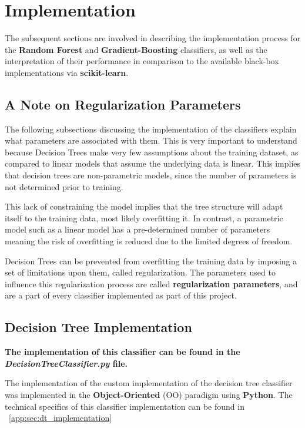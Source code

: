 \graphicspath{{images/}}

\section{Implementation}

The subsequent sections are involved in describing the implementation process for the \textbf{Random Forest} and \textbf{Gradient-Boosting} classifiers,
as well as the interpretation of their performance in comparison to the available black-box implementations via \textbf{scikit-learn}.

\subsection{A Note on Regularization Parameters}

The following subsections discussing the implementation of the classifiers explain what parameters are associated with them.
This is very important to understand because Decision Trees make very few assumptions about the training dataset, as compared to linear models that assume the underlying data is linear.
This implies that decision trees are non-parametric models, since the number of parameters is not determined prior to training.

This lack of constraining the model implies that the tree structure will adapt itself to the training data, most likely overfitting it. In contrast, a parametric model such as a linear model has a pre-determined number of parameters meaning the risk of overfitting is reduced due to the limited degrees of freedom.

Decision Trees can be prevented from overfitting the training data by imposing a set of limitations upon them, called regularization.
The parameters used to influence this regularization process are called \textbf{regularization parameters}, and are a part of every classifier implemented as part of this project.

\subsection{Decision Tree Implementation}

\textbf{The implementation of this classifier can be found in the \textit{DecisionTreeClassifier.py} file.}

The implementation of the custom implementation of the decision tree classifier was implemented in the \textbf{Object-Oriented} (OO) paradigm using \textbf{Python}. The technical specifics of this classifier implementation can be found in ~\autoref{app:sec:dt_implementation}



